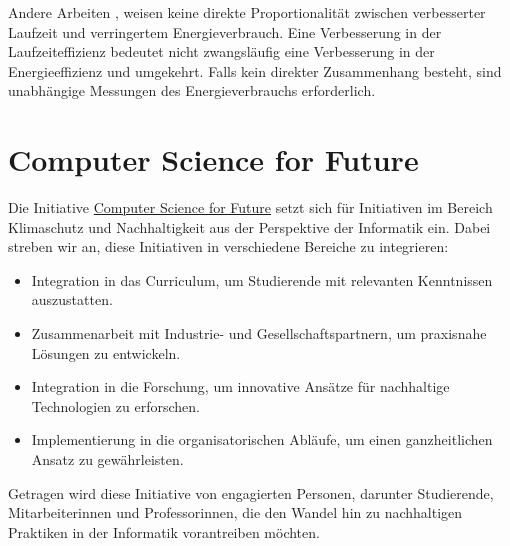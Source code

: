 \documentclass{article}
\begin{document}
Andere Arbeiten  \cite{trefethen_energy-aware_2013,lima_haskell_2016}, weisen keine direkte Proportionalität zwischen verbesserter Laufzeit und verringertem  Energieverbrauch. Eine Verbesserung in der Laufzeiteffizienz bedeutet nicht zwangsläufig eine Verbesserung in der Energieeffizienz und umgekehrt.
Falls kein direkter Zusammenhang besteht, sind  unabhängige  Messungen  des Energieverbrauchs erforderlich. 



\section{Computer Science for Future}

Die Initiative \href{https://cs4f.de}{Computer Science for Future} setzt sich für Initiativen im Bereich Klimaschutz und Nachhaltigkeit aus der Perspektive der Informatik ein. Dabei streben wir an, diese Initiativen in verschiedene Bereiche zu integrieren:

\begin{itemize}
	\item Integration in das Curriculum, um Studierende mit relevanten Kenntnissen auszustatten.
	\item Zusammenarbeit mit Industrie- und Gesellschaftspartnern, um praxisnahe Lösungen zu entwickeln.
	\item Integration in die Forschung, um innovative Ansätze für nachhaltige Technologien zu erforschen.
	\item Implementierung in die organisatorischen Abläufe, um einen ganzheitlichen Ansatz zu gewährleisten.
\end{itemize}
Getragen wird diese Initiative von engagierten Personen, darunter Studierende, Mitarbeiterinnen und Professorinnen, die den Wandel hin zu nachhaltigen Praktiken in der Informatik vorantreiben möchten.


\printbibliography %
\end{document}
